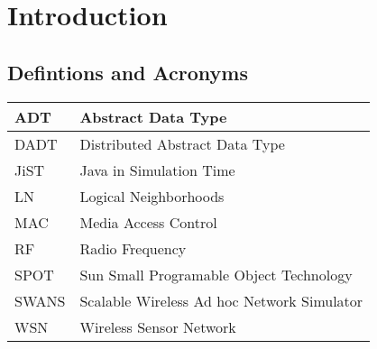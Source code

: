 \chapter{Introduction}

\section{Defintions and Acronyms}

\begin{tabular}{| l |p{9cm}|}
\hline
ADT \T \B & Abstract Data Type \\
\hline
DADT \T \B & Distributed Abstract Data Type \\
\hline
JiST \T \B & Java in Simulation Time \\
\hline
LN \T \B & Logical Neighborhoods \\
\hline
MAC \T \B & Media Access Control \\
\hline
RF \T \B & Radio Frequency \\
\hline
SPOT \T \B & Sun Small Programable Object Technology \\
\hline
SWANS \T \B & Scalable Wireless Ad hoc Network Simulator \\
\hline
WSN \T \B & Wireless Sensor Network \\
\hline


\end{tabular}

